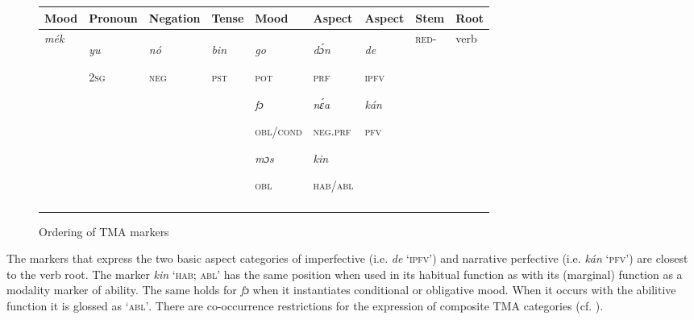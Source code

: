 \begin{figure}
\caption{Ordering of TMA markers}
\label{fig:key:6.1}
{\footnotesize\begin{tabularx}{\textwidth}{XXXX QQQ XX}
\lsptoprule

Mood & Pronoun & Negation & Tense & Mood & Aspect & Aspect & Stem & Root\\
\midrule
{\itshape mék}

 &  \textit{yu}

\textsc{2sg} & {\itshape nó}

\textsc{neg} & {\itshape bin}

\textsc{pst} & {\itshape go}

\textsc{pot}

{\itshape fɔ}

\textsc{obl/cond}

{\itshape mɔs}

\textsc{obl} & {\itshape dɔ́n}

\textsc{prf}

{\itshape nɛ́a}

\textsc{neg}.\textsc{prf}

{\itshape kin}

\textsc{hab/abl} & {\itshape \textit{de}}

\textsc{ipfv}

{\itshape kán}

\textsc{pfv} & \textsc{red}{}- & verb\\
\lspbottomrule
\end{tabularx}}
\end{figure}

The markers that express the two basic aspect categories of imperfective (i.e. \textit{de} ‘\textsc{ipfv}’) and narrative perfective (i.e. \textit{kán} ‘\textsc{pfv}’) are closest to the verb root. The marker \textit{kin} ‘\textsc{hab;} \textsc{abl}’ has the same position when used in its habitual function as with its (marginal) function as a modality marker of ability. The same holds for \textit{fɔ} when it instantiates conditional or obligative mood. When it occurs with the abilitive function it is glossed as ‘\textsc{abl’}. There are co-occurrence restrictions for the expression of composite TMA categories (cf. ). 


